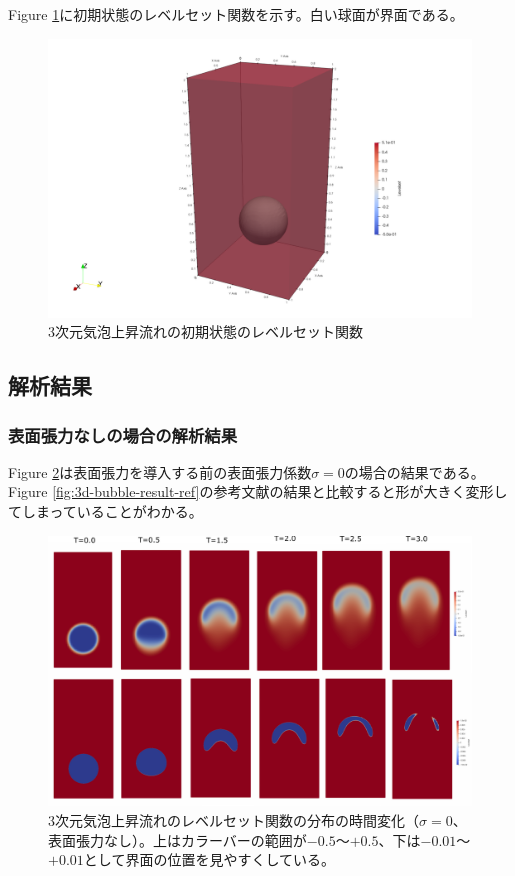 \documentclass[8pt,a4paper]{article}
\begin{document}
Figure \ref{fig:3d-bubble-levelset_t0_3d}に初期状態のレベルセット関数を示す。白い球面が界面である。

\begin{figure}[H]
	\centering
	\includegraphics[width=10truecm]{pics/3d-bubble/levelset_t0_3d.pdf}
	\caption{3次元気泡上昇流れの初期状態のレベルセット関数}
	\label{fig:3d-bubble-levelset_t0_3d}
\end{figure}

\subsection{解析結果}
\subsubsection{表面張力なしの場合の解析結果}
Figure \ref{fig:3d-bubble-result_sigma0}は表面張力を導入する前の表面張力係数$\sigma=0$の場合の結果である。Figure \ref{fig:3d-bubble-result-ref}の参考文献の結果と比較すると形が大きく変形してしまっていることがわかる。

\begin{figure}[H]
	\centering
	\includegraphics[width=18truecm]{pics/3d-bubble/levelset_t0-3.pdf}
	\caption{3次元気泡上昇流れのレベルセット関数の分布の時間変化（$\sigma=0$、表面張力なし）。上はカラーバーの範囲が$-0.5$～$+0.5$、下は$-0.01$～$+0.01$として界面の位置を見やすくしている。}
	\label{fig:3d-bubble-result_sigma0}
\end{figure}
\end{document}
